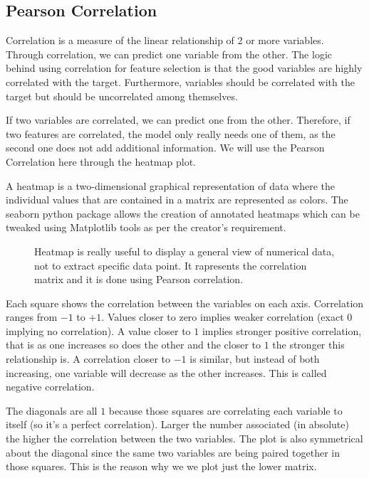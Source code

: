 \subsection{Pearson Correlation}
Correlation is a measure of the linear relationship of 2 or more variables. Through correlation, we can predict one variable from the other. The logic behind using correlation for feature selection is that the good variables are highly correlated with the target. Furthermore, variables should be correlated with the target but should be uncorrelated among themselves.

\noindent If two variables are correlated, we can predict one from the other. Therefore, if two features are correlated, the model only really needs one of them, as the second one does not add additional information. We will use the Pearson Correlation here through the heatmap plot.

\noindent A heatmap is a two-dimensional graphical representation of data where the individual values that are contained in a matrix are represented as colors. The seaborn python package allows the creation of annotated heatmaps which can be tweaked using Matplotlib tools as per the creator’s requirement.

\begin{figure}[H]
	\caption[Heatmap.]{Heatmap is really useful to display a general view of numerical data, not to extract specific data point. It rapresents the correlation matrix and it is done using Pearson correlation.}\label{fig:correlation}
\end{figure}

\noindent Each square shows the correlation between the variables on each axis. Correlation ranges from $-1$ to $+1$. Values closer to zero implies weaker correlation (exact $0$ implying no correlation). A value closer to $1$ implies stronger positive correlation, that is as one increases so does the other and the closer to $1$ the stronger this relationship is. A correlation closer to $-1$ is similar, but instead of both increasing, one variable will decrease as the other increases. This is called negative correlation.

\noindent The diagonals are all $1$ because those squares are correlating each variable to itself (so it's a perfect correlation). Larger the number associated (in absolute) the higher the correlation between the two variables. The plot is also symmetrical about the diagonal since the same two variables are being paired together in those squares. This is the reason why we we plot just the lower matrix.

